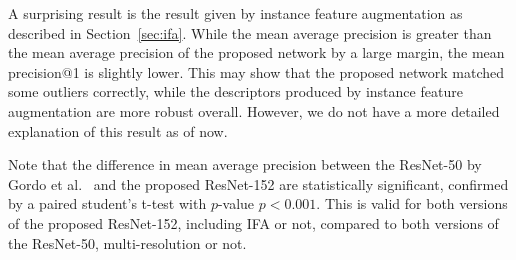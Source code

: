 A surprising result is the result given by instance feature augmentation as
described in Section~\ref{sec:ifa}. While the mean average precision is
greater than the mean average precision of the proposed network by a large
margin, the mean precision@1 is slightly lower. This may show that the
proposed network matched some outliers correctly, while the descriptors
produced by instance feature augmentation are more robust overall.
However, we do not have a more detailed explanation of this result as of now.

Note that the difference in mean average precision between the ResNet-50
by Gordo et al.~\cite{gordo_deep_2016} and the proposed ResNet-152 are
statistically significant, confirmed by a paired student's t-test with
$p$-value $p<0.001$. This is valid for both versions of the proposed
ResNet-152, including IFA or not, compared to both versions of the
ResNet-50, multi-resolution or not.
